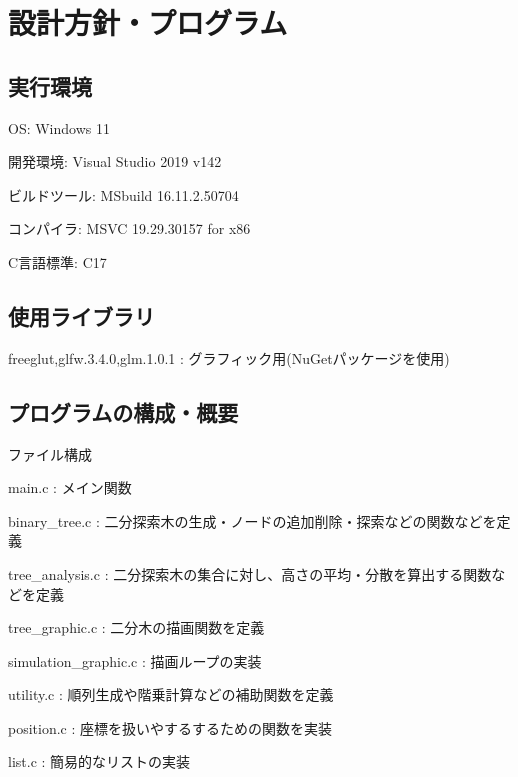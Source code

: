 \documentclass{ltjsarticle}
\title{}
\author{62304644 片山さくら}
\begin{document}
\maketitle

\section{設計方針・プログラム}

\subsection{実行環境}
\begin{list}{}{\leftmargin=1em}
\item OS: Windows 11
\item 開発環境: Visual Studio 2019 v142
\item ビルドツール: MSbuild 16.11.2.50704
\item コンパイラ: MSVC 19.29.30157 for x86
\item C言語標準: C17
\end{list}

\subsection{使用ライブラリ}
\begin{list}{}{\leftmargin=1em}
\item freeglut,glfw.3.4.0,glm.1.0.1 : グラフィック用(NuGetパッケージを使用)
\end{list}

\subsection{プログラムの構成・概要}

ファイル構成

\begin{list}{}{\leftmargin=1em}
\item main.c : メイン関数
\item binary\_tree.c : 二分探索木の生成・ノードの追加削除・探索などの関数などを定義
\item tree\_analysis.c : 二分探索木の集合に対し、高さの平均・分散を算出する関数などを定義
\item tree\_graphic.c : 二分木の描画関数を定義
\item simulation\_graphic.c : 描画ループの実装
\item utility.c : 順列生成や階乗計算などの補助関数を定義
\item position.c : 座標を扱いやするするための関数を実装
\item list.c : 簡易的なリストの実装
\end{list}
\end{document}
